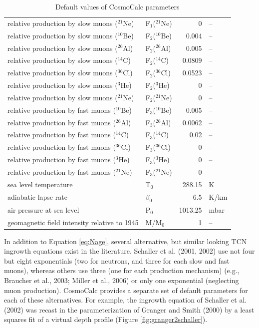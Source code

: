 \documentclass{article}
\begin{document}
\begin{table}[here]
\begin{tabular}{llrl}
relative production by slow muons ($^{21}$Ne) & F$_1$($^{21}$Ne) & 0 & -- \\
relative production by slow muons ($^{10}$Be) & F$_2$($^{10}$Be) & 0.004 & -- \\
relative production by slow muons ($^{26}$Al) & F$_2$($^{26}$Al) & 0.005 & -- \\
relative production by slow muons ($^{14}$C) & F$_2$($^{14}$C) &   0.0809 & -- \\
relative production by slow muons ($^{36}$Cl) & F$_2$($^{36}$Cl) & 0.0523 & -- \\
relative production by slow muons ($^{3}$He) & F$_2$($^{3}$He) &   0 & -- \\
relative production by slow muons ($^{21}$Ne) & F$_2$($^{21}$Ne) & 0 & -- \\
relative production by fast muons ($^{10}$Be) & F$_3$($^{10}$Be) & 0.005 & -- \\
relative production by fast muons ($^{26}$Al) & F$_3$($^{26}$Al) & 0.0062 & -- \\
relative production by fast muons ($^{14}$C) & F$_3$($^{14}$C) &   0.02 & -- \\
relative production by fast muons ($^{36}$Cl) & F$_3$($^{36}$Cl) & 0 & -- \\
relative production by fast muons ($^{3}$He) & F$_3$($^{3}$He) &   0 & -- \\
relative production by fast muons ($^{21}$Ne) & F$_3$($^{21}$Ne) & 0 & -- \\
sea level temperature &     T$_0$ &     288.15 &          K \\
adiabatic lapse rate & $\beta_0$ &        6.5 &       K/km \\
air pressure at sea level &     P$_0$ &    1013.25 &       mbar \\
geomagnetic field intensity relative to 1945 &   M/M$_0$ &          1 &   --         \\
\end{tabular}  
  \caption{Default values of CosmoCalc parameters}
  \label{tab:defaults}
\end{table}

In  addition  to  Equation  \ref{eq:Nage},  several  alternative,  but
similar  looking  TCN ingrowth  equations  exist  in  the literature.  
Schaller et al. (2001, 2002)  use not four but eight exponentials (two
for neutrons, and three for  each slow and fast muons), whereas others
use three (one for each  production mechanism) (e.g., Braucher et al.,
2003; Miller  et al., 2006)  or only one exponential  (neglecting muon
production).  CosmoCalc provides a  separate set of default parameters
for each of these alternatives.  For example, the ingrowth equation of
Schaller et al.  (2002) was  recast in the parameterization of Granger
and Smith  (2000) by a  least squares fit  of a virtual  depth profile
(Figure \ref{fig:granger2schaller}).
\end{document}
